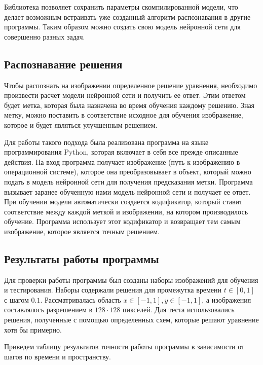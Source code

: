 \documentclass[12pt, a4paper]{article}
\begin{document}
 Библиотека позволяет сохранить параметры скомпилированной модели, что делает возможным встраивать уже созданный алгоритм распознавания в другие программы. Таким образом можно создать свою модель нейронной сети для совершенно разных задач.
 
  
 
 
\subsection{Распознавание решения}

Чтобы распознать на изображении определенное решение уравнения, необходимо произвести расчет модели нейронной сети и получить ее ответ. Этим ответом будет метка, которая была назначена во время обучения каждому решению. Зная метку, можно поставить в соответствие исходное для обучения изображение, которое и будет являться улучшенным решением. 

Для работы такого подхода была реализована программа на языке программирования Python, которая включает в себя все прежде описанные действия. На вход программа получает изображение (путь к изображению в операционной системе), которое она преобразовывает в объект, который можно подать в модель нейронной сети для получения предсказания метки. Программа вызывает заранее обученную нами модель нейронной сети и получает ее ответ. При обучении модели автоматически создается кодификатор, который ставит соответствие между каждой меткой и изображении, на котором производилось обучение. Программа использует этот кодификатор и возвращает тем самым изображение, которое является точным решением.

\subsection{Результаты работы программы}
Для проверки работы программы был созданы наборы изображений для обучения и тестирования. Наборы содержали решения для промежутка времени $t \in [0, 1]$ с шагом $0.1$. Рассматривалась область $x \in [-1, 1], y \in [-1, 1]$, а изображения составлялось разрешением в $128 \cdot 128$ пикселей. Для теста использовались решения, полученные с помощью определенных схем, которые решают уравнение хотя бы примерно. 

Приведем таблицу результатов точности работы программы в зависимости от шагов по времени и пространству.
\end{document}
